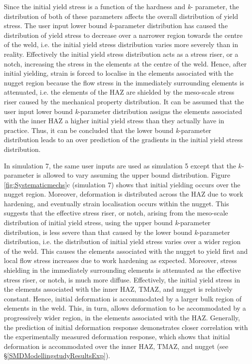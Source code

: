 Since the initial yield stress is a function of the hardness and \textit{k}- parameter, the distribution of both of these parameters affects the overall distribution of yield stress. The user input lower bound \textit{k}-parameter distribution has caused the distribution of yield stress to decrease over a narrower region towards the centre of the weld, i.e. the initial yield stress distribution varies more severely than in reality. Effectively the initial yield stress distribution acts as a stress riser, or a notch, increasing the stress in the elements at the centre of the weld. Hence, after initial yielding, strain is forced to localise in the elements associated with the nugget region because the flow stress in the immediately surrounding elements is attenuated, i.e. the elements of the HAZ are shielded by the meso-scale stress riser caused by the mechanical property distribution. It can be assumed that the user input lower bound \textit{k}-parameter distribution assigns the elements associated with the inner HAZ a higher initial yield stress than they actually have in practice. Thus, it can be concluded that the lower bound \textit{k}-parameter distribution leads to an over prediction of the gradients in the initial yield stress distribution.

In simulation 7, the same user inputs are used as simulation 5 except that the $k$-parameter is allowed to vary assuming the upper bound distribution. Figure \ref{fig:Systematicmechs}c (simulation 7) shows that initial yielding occurs over the nugget region. Moreover, deformation is distributed across the HAZ due to work hardening, and eventually strain localisation occurs within the nugget. This suggests that the effective stress riser, or notch, arising from the meso-scale distribution of initial yield stress, using the upper bound \textit{k}-parameter distribution, is less severe than that caused by the lower bound \textit{k}-parameter distribution, i.e. the distribution of initial yield stress varies over a wider region of the weld. This causes the elements associated with the nugget to yield first and local flow stress increases due to work hardening as expected. Moreover, stress shielding in the immediately surrounding elements is attenuated as the effective stress riser, or notch, is much more diffuse. Effectively, the initial yield stress in the elements associated with the inner HAZ, TMAZ, and nugget is relatively constant. Hence, initial deformation is accommodated by a larger bulk region of elements in the weld. This, in turn, allows deformation to be accommodated by a progressively wider region, in the elements associated with the HAZ. Generally, the prediction of initial deformation response demonstrates closer correlation with the experimentally measured deformation response, which shows that initial deformation is accommodated over the inner HAZ, TMAZ, and nugget (see \S\ref{SMDModellingstudyResultsExp}). 

